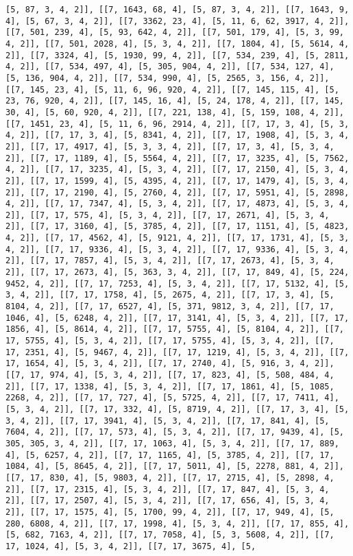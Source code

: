 \documentclass[12pt,fleqn]{article}\usepackage{../../common}
\begin{document}
\begin{verbatim}
[5, 87, 3, 4, 2]], [[7, 1643, 68, 4], [5, 87, 3, 4, 2]], [[7, 1643, 9, 4], [5, 67, 3, 4, 2]], [[7, 3362, 23, 4], [5, 11, 6, 62, 3917, 4, 2]], [[7, 501, 239, 4], [5, 93, 642, 4, 2]], [[7, 501, 179, 4], [5, 3, 99, 4, 2]], [[7, 501, 2028, 4], [5, 3, 4, 2]], [[7, 1804, 4], [5, 5614, 4, 2]], [[7, 3324, 4], [5, 1930, 99, 4, 2]], [[7, 534, 239, 4], [5, 2811, 4, 2]], [[7, 534, 497, 4], [5, 305, 904, 4, 2]], [[7, 534, 127, 4], [5, 136, 904, 4, 2]], [[7, 534, 990, 4], [5, 2565, 3, 156, 4, 2]], [[7, 145, 23, 4], [5, 11, 6, 96, 920, 4, 2]], [[7, 145, 115, 4], [5, 23, 76, 920, 4, 2]], [[7, 145, 16, 4], [5, 24, 178, 4, 2]], [[7, 145, 30, 4], [5, 60, 920, 4, 2]], [[7, 221, 138, 4], [5, 159, 108, 4, 2]], [[7, 1451, 23, 4], [5, 11, 6, 96, 2914, 4, 2]], [[7, 17, 3, 4], [5, 3, 4, 2]], [[7, 17, 3, 4], [5, 8341, 4, 2]], [[7, 17, 1908, 4], [5, 3, 4, 2]], [[7, 17, 4917, 4], [5, 3, 3, 4, 2]], [[7, 17, 3, 4], [5, 3, 4, 2]], [[7, 17, 1189, 4], [5, 5564, 4, 2]], [[7, 17, 3235, 4], [5, 7562, 4, 2]], [[7, 17, 3235, 4], [5, 3, 4, 2]], [[7, 17, 2150, 4], [5, 3, 4, 2]], [[7, 17, 1599, 4], [5, 4395, 4, 2]], [[7, 17, 1479, 4], [5, 3, 4, 2]], [[7, 17, 2190, 4], [5, 2760, 4, 2]], [[7, 17, 5951, 4], [5, 2898, 4, 2]], [[7, 17, 7347, 4], [5, 3, 4, 2]], [[7, 17, 4873, 4], [5, 3, 4, 2]], [[7, 17, 575, 4], [5, 3, 4, 2]], [[7, 17, 2671, 4], [5, 3, 4, 2]], [[7, 17, 3160, 4], [5, 3785, 4, 2]], [[7, 17, 1151, 4], [5, 4823, 4, 2]], [[7, 17, 4562, 4], [5, 9121, 4, 2]], [[7, 17, 1731, 4], [5, 3, 4, 2]], [[7, 17, 9336, 4], [5, 3, 4, 2]], [[7, 17, 9336, 4], [5, 3, 4, 2]], [[7, 17, 7857, 4], [5, 3, 4, 2]], [[7, 17, 2673, 4], [5, 3, 4, 2]], [[7, 17, 2673, 4], [5, 363, 3, 4, 2]], [[7, 17, 849, 4], [5, 224, 9452, 4, 2]], [[7, 17, 7253, 4], [5, 3, 4, 2]], [[7, 17, 5132, 4], [5, 3, 4, 2]], [[7, 17, 1758, 4], [5, 2675, 4, 2]], [[7, 17, 3, 4], [5, 8104, 4, 2]], [[7, 17, 6527, 4], [5, 371, 9812, 3, 4, 2]], [[7, 17, 1046, 4], [5, 6248, 4, 2]], [[7, 17, 3141, 4], [5, 3, 4, 2]], [[7, 17, 1856, 4], [5, 8614, 4, 2]], [[7, 17, 5755, 4], [5, 8104, 4, 2]], [[7, 17, 5755, 4], [5, 3, 4, 2]], [[7, 17, 5755, 4], [5, 3, 4, 2]], [[7, 17, 2351, 4], [5, 9467, 4, 2]], [[7, 17, 1219, 4], [5, 3, 4, 2]], [[7, 17, 1654, 4], [5, 3, 4, 2]], [[7, 17, 2740, 4], [5, 916, 3, 4, 2]], [[7, 17, 974, 4], [5, 3, 4, 2]], [[7, 17, 823, 4], [5, 508, 484, 4, 2]], [[7, 17, 1338, 4], [5, 3, 4, 2]], [[7, 17, 1861, 4], [5, 1085, 2268, 4, 2]], [[7, 17, 727, 4], [5, 5725, 4, 2]], [[7, 17, 7411, 4], [5, 3, 4, 2]], [[7, 17, 332, 4], [5, 8719, 4, 2]], [[7, 17, 3, 4], [5, 3, 4, 2]], [[7, 17, 3941, 4], [5, 3, 4, 2]], [[7, 17, 841, 4], [5, 7604, 4, 2]], [[7, 17, 573, 4], [5, 3, 4, 2]], [[7, 17, 9439, 4], [5, 305, 305, 3, 4, 2]], [[7, 17, 1063, 4], [5, 3, 4, 2]], [[7, 17, 889, 4], [5, 6257, 4, 2]], [[7, 17, 1165, 4], [5, 3785, 4, 2]], [[7, 17, 1084, 4], [5, 8645, 4, 2]], [[7, 17, 5011, 4], [5, 2278, 881, 4, 2]], [[7, 17, 830, 4], [5, 9803, 4, 2]], [[7, 17, 2715, 4], [5, 2898, 4, 2]], [[7, 17, 2315, 4], [5, 3, 4, 2]], [[7, 17, 847, 4], [5, 3, 4, 2]], [[7, 17, 2507, 4], [5, 3, 4, 2]], [[7, 17, 656, 4], [5, 3, 4, 2]], [[7, 17, 1575, 4], [5, 1700, 99, 4, 2]], [[7, 17, 949, 4], [5, 280, 6808, 4, 2]], [[7, 17, 1998, 4], [5, 3, 4, 2]], [[7, 17, 855, 4], [5, 682, 7163, 4, 2]], [[7, 17, 7058, 4], [5, 3, 5608, 4, 2]], [[7, 17, 1024, 4], [5, 3, 4, 2]], [[7, 17, 3675, 4], [5, 
\end{verbatim}
\end{document}
